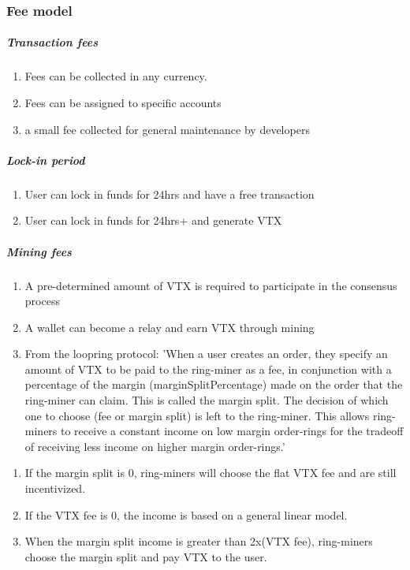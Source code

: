 \documentclass[]{article}
\begin{document}
\subsubsection{Fee model}
\subparagraph{Transaction fees\\}
\begin{enumerate}
	\item Fees can be collected in any currency.\\
	\item Fees can be assigned to specific accounts\\
	\item a small fee collected for general maintenance by developers\\
\end{enumerate}
\subparagraph{Lock-in period\\}
\begin{enumerate}
	\item User can lock in funds for 24hrs and have a free transaction\\
	\item User can lock in funds for 24hrs+ and generate VTX \\
\end{enumerate}
\subparagraph{Mining fees}
\begin{enumerate}
\item A pre-determined amount of VTX is required to participate in the consensus process
\item A wallet can become a relay and earn VTX through mining
\item From the loopring protocol:
'When a user creates an order, they specify an amount of VTX to be paid to the ring-miner as a fee, in conjunction with a percentage of the margin (marginSplitPercentage) made on the order that the ring-miner can claim. This is
called the margin split. The decision of which one to choose
(fee or margin split) is left to the ring-miner.
This allows ring-miners to receive a constant income on 
low margin order-rings for the tradeoff of receiving less 
income on higher margin order-rings.'
\end{enumerate}
\begin{enumerate}
	\item If the margin split is 0, ring-miners will choose the flat VTX fee and are still incentivized.
	
	\item If the VTX fee is 0, the income is based on a general linear model.
	
	\item When the margin split income is greater than 2x(VTX fee), ring-miners choose the margin split and pay VTX to the user. 
\end{enumerate}	
\end{document}
